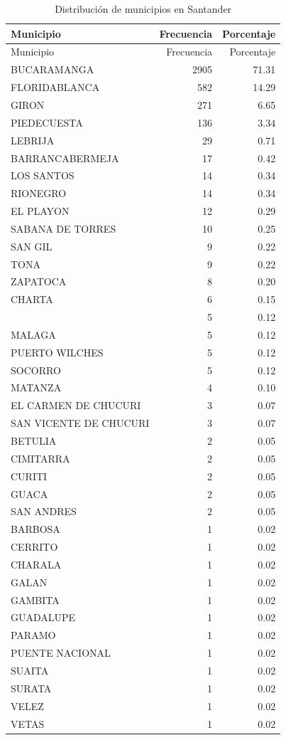 \documentclass[
]{article}
\begin{document}
\begin{longtable}[]{@{}lrr@{}}
\caption{Distribución de municipios en Santander}\tabularnewline
\toprule\noalign{}
Municipio & Frecuencia & Porcentaje \\
\midrule\noalign{}
\endfirsthead
\toprule\noalign{}
Municipio & Frecuencia & Porcentaje \\
\midrule\noalign{}
\endhead
\bottomrule\noalign{}
\endlastfoot
BUCARAMANGA & 2905 & 71.31 \\
FLORIDABLANCA & 582 & 14.29 \\
GIRON & 271 & 6.65 \\
PIEDECUESTA & 136 & 3.34 \\
LEBRIJA & 29 & 0.71 \\
BARRANCABERMEJA & 17 & 0.42 \\
LOS SANTOS & 14 & 0.34 \\
RIONEGRO & 14 & 0.34 \\
EL PLAYON & 12 & 0.29 \\
SABANA DE TORRES & 10 & 0.25 \\
SAN GIL & 9 & 0.22 \\
TONA & 9 & 0.22 \\
ZAPATOCA & 8 & 0.20 \\
CHARTA & 6 & 0.15 \\
& 5 & 0.12 \\
MALAGA & 5 & 0.12 \\
PUERTO WILCHES & 5 & 0.12 \\
SOCORRO & 5 & 0.12 \\
MATANZA & 4 & 0.10 \\
EL CARMEN DE CHUCURI & 3 & 0.07 \\
SAN VICENTE DE CHUCURI & 3 & 0.07 \\
BETULIA & 2 & 0.05 \\
CIMITARRA & 2 & 0.05 \\
CURITI & 2 & 0.05 \\
GUACA & 2 & 0.05 \\
SAN ANDRES & 2 & 0.05 \\
BARBOSA & 1 & 0.02 \\
CERRITO & 1 & 0.02 \\
CHARALA & 1 & 0.02 \\
GALAN & 1 & 0.02 \\
GAMBITA & 1 & 0.02 \\
GUADALUPE & 1 & 0.02 \\
PARAMO & 1 & 0.02 \\
PUENTE NACIONAL & 1 & 0.02 \\
SUAITA & 1 & 0.02 \\
SURATA & 1 & 0.02 \\
VELEZ & 1 & 0.02 \\
VETAS & 1 & 0.02 \\
\end{longtable}
\end{document}
